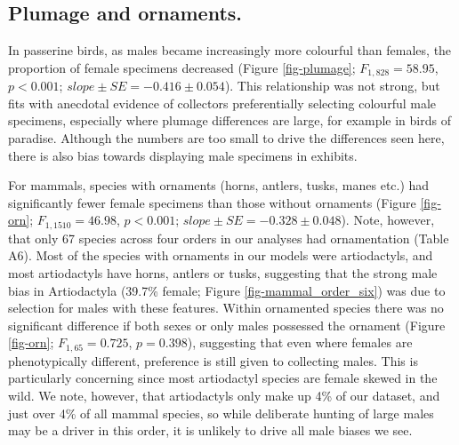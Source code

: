 \documentclass[a4paper, 12pt]{article}
\begin{document}
\subsection{Plumage and ornaments.} 
In passerine birds, as males became increasingly more colourful than females, the proportion of female specimens decreased (Figure \ref{fig-plumage}; $F_{1, 828} = 58.95$, $p < 0.001$; $slope \pm SE = -0.416 \pm 0.054$). 
This relationship was not strong, but fits with anecdotal evidence of collectors preferentially selecting colourful male specimens, especially where plumage differences are large, for example in birds of paradise. 
Although the numbers are too small to drive the differences seen here, there is also bias towards displaying male specimens in exhibits\cite{machin2008}.

For mammals, species with ornaments (horns, antlers, tusks, manes etc.) had significantly fewer female specimens than those without ornaments (Figure \ref{fig-orn}; $F_{1, 1510} = 46.98$, $p < 0.001$; $slope \pm SE = -0.328 \pm 0.048$). 
Note, however, that only 67 species across four orders in our analyses had ornamentation (Table A6).
Most of the species with ornaments in our models were artiodactyls, and most artiodactyls have horns, antlers or tusks, suggesting that the strong male bias in Artiodactyla (39.7\% female; Figure \ref{fig-mammal_order_six}) was due to selection for males with these features. 
Within ornamented species there was no significant difference if both sexes or only males possessed the ornament (Figure \ref{fig-orn}; $F_{1, 65} = 0.725$, $p = 0.398$), suggesting that even where females are phenotypically different, preference is still given to collecting males. 
This is particularly concerning since most artiodactyl species are female skewed in the wild\cite{berger1999sex}. 
We note, however, that artiodactyls only make up 4\% of our dataset, and just over 4\% of all mammal species\cite{wilson2005mammal}, so while deliberate hunting of large males may be a driver in this order, it is unlikely to drive all male biases we see.
\end{document}
